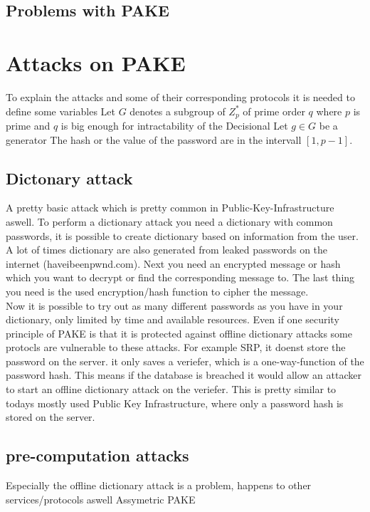 \documentclass[journal]{IEEEtran}
\begin{document}
\subsection{Problems with PAKE}

\section{Attacks on PAKE}
To explain the attacks and some of their corresponding protocols it is needed to define some variables
Let $G$ denotes a subgroup of $Z^{*}_{p}$ of prime order $q$ where $p$ is prime and $q$ is big enough for intractability of the Decisional %
Let $g \in G$ be a generator
The hash or the value of the password are in the intervall $[1,p-1]$.
\subsection{Dictonary attack}
A pretty basic attack which is pretty common in Public-Key-Infrastructure aswell.
To perform a dictionary attack you need a dictionary with common passwords, it is possible to create dictionary based on information from the user. 
A lot of times dictionary are also generated from leaked passwords on the internet (haveibeenpwnd.com).
Next you need an encrypted message or hash which you want to decrypt or find the corresponding message to.
The last thing you need is the used encryption/hash function to cipher the message. \\
Now it is possible to try out as many different passwords as you have in your dictionary, only limited by time and available resources.
Even if one security principle of PAKE is that it is protected against offline dictionary attacks some protocls are vulnerable to these attacks.
For example SRP, it doenst store the password on the server. it only saves a veriefer, which is a one-way-function of the password hash.
This means if the database is breached it would allow an attacker to start an offline dictionary attack on the veriefer. 
This is pretty similar to todays mostly used Public Key Infrastructure, where only a password hash is stored on the server.
\subsection{pre-computation attacks}
Especially the offline dictionary attack is a problem, happens to other services/protocols aswell
Assymetric PAKE
\end{document}
